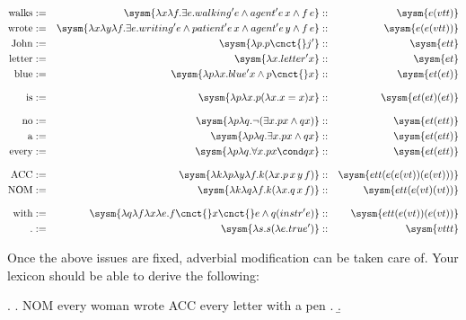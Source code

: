 \documentclass[10pt,a4paper]{exam}
\begin{document}
\begin{questions}
\begin{solution}
\begin{ulexicon}
\begin{align*}
	\text{walks}   &:=& \sysm{\lambda x\lambda f . \exists e . walking' e \land agent' e\, x \land f\, e }  &::& \sysm{e(vtt)}\\
	\text{wrote}   &:=& \sysm{\lambda x\lambda y\lambda f.\exists e . writing' e \land patient' e\, x \land agent' e\, y \land f\, e }  &::& \sysm{e(e(vtt))}\\
	\text{John}    &:=& \sysm{\lambda p.p\cnct{}j'}                      &::& \sysm{ett}\\
	\text{letter}  &:=& \sysm{\lambda x.letter'x}                          &::& \sysm{et}\\
	\text{blue}    &:=& \sysm{\lambda p\lambda x.blue'x\land p\cnct{}x}  &::& \sysm{et(et)}\\[8pt]
	\text{is}      &:=& \sysm{\lambda p\lambda x.p (\lambda x.x=x) x}    &::& \sysm{et(et)(et)}\\[8pt]
	\text{no}      &:=& \sysm{\lambda p\lambda q.\neg(\exists x. px \land qx)} &::& \sysm{et(ett)}\\
	\text{a}       &:=& \sysm{\lambda p\lambda q.\exists x. px \land qx} &::& \sysm{et(ett)}\\
	\text{every}   &:=& \sysm{\lambda p\lambda q.\forall x. px \cond qx} &::& \sysm{et(ett)}\\[8pt]
	\text{ACC}     &:=& \sysm{\lambda k \lambda p\lambda y \lambda f . k (\lambda x . p\, x\, y\, f )} &::& \sysm{ett(e(e(vt))(e(vt)))}\\ 
	\text{NOM}     &:=& \sysm{\lambda k \lambda q \lambda f . k (\lambda x . q\, x\, f)} &::& \sysm{ett(e(vt)(vt))}\\[8pt]
	\text{with}    &:=& \sysm{\lambda q\lambda f\lambda x\lambda e . f\cnct{}x\cnct{}e \land q (instr' e)} &::& \sysm{ett(e(vt))(e(vt))}\\
	\text{.}   &:=& \sysm{\lambda s . s (\lambda e . true') }  &::& \sysm{vttt}
\end{align*}
\end{ulexicon}

\end{solution}



\question[20]

Once the above issues are fixed, adverbial modification can be taken care of. Your lexicon should be able to derive the following:

\ex.
\a. NOM every woman wrote ACC every letter with a pen .
\b. 



\end{questions}
\end{document}
